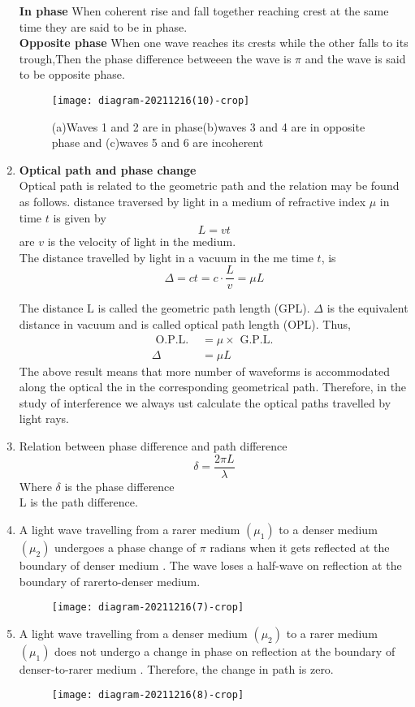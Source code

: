 \begin{enumerate}
	\textbf{In phase}
	When coherent rise and fall together reaching crest at the same time they are said to be in phase.\\
	\textbf{Opposite phase} When one wave reaches its crests while the other falls to its trough,Then the phase difference betweeen the wave is $\pi$ and the wave is said to be opposite phase.
	\begin{figure}[H]
		\centering
		\texttt{[image: diagram-20211216(10)-crop]}
		\caption{(a)Waves 1 and 2 are in phase(b)waves 3 and 4 are in opposite phase and (c)waves 5 and 6 are incoherent}
		\label{}
	\end{figure}
	\item \textbf{Optical path and phase change}\\
	Optical path is related to the geometric path and the relation may be found as follows. distance traversed by light in a medium of refractive index $\mu$ in time $t$ is given by
	$$
	L=v t
	$$
	are $v$ is the velocity of light in the medium.\\
	The distance travelled by light in a vacuum in the me time $t$, is $$\Delta=c t=c \cdot \frac{L}{v}=\mu L$$
	
	The distance $\mathrm{L}$ is called the geometric path length (GPL). $\Delta$ is the equivalent distance in vacuum and is called optical path length (OPL). Thus,
	$$
	\begin{aligned}
	\text { O.P.L. } &=\mu \times \text { G.P.L. } \\
	\Delta &=\mu L
	\end{aligned}
	$$
	The above result means that more number of waveforms is accommodated along the optical the in the corresponding geometrical path. Therefore, in the study of interference we always ust calculate the optical paths travelled by light rays.\\
	\item Relation between phase difference and path difference\\
	$$\delta=\frac{2 \pi L}{\lambda}$$
	Where $\delta$ is the phase difference\\
	L is the path difference.
	\item  A light wave travelling from a rarer medium $\left(\mu_{1}\right)$ to a denser medium $\left(\mu_{2}\right)$ undergoes a phase change of $\pi$ radians when it gets reflected at the boundary of denser medium . The wave loses a half-wave on reflection at the boundary of rarerto-denser medium.
	\begin{figure}[H]
		\centering
		\texttt{[image: diagram-20211216(7)-crop]}
		\caption{}
		\label{}
	\end{figure}
	\item A light wave travelling from a denser medium $\left(\mu_{2}\right)$ to a rarer medium $\left(\mu_{1}\right)$ does not undergo a change in phase on reflection at the boundary of denser-to-rarer medium . Therefore, the change in path is zero.
	\begin{figure}[H]
		\centering
		\texttt{[image: diagram-20211216(8)-crop]}
		\caption{}
		\label{}
	\end{figure}
\end{enumerate}

